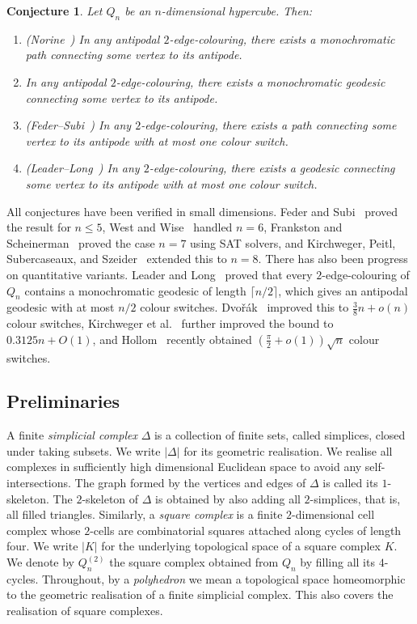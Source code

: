 \documentclass[12pt,UKenglish]{amsart}
\theoremstyle{plain}
\newtheorem{conjecture}[conjecture]{Conjecture}
\theoremstyle{definition}
\theoremstyle{remark}
\begin{document}
\begin{conjecture}\label{NorineConj}
    Let \(Q_n\) be an \(n\)-dimensional hypercube. Then:
    \begin{enumerate}
        \item (Norine~\cite{Norine}) In any antipodal \(2\)-edge-colouring, there exists a monochromatic path connecting some vertex to its antipode.
        \item In any antipodal \(2\)-edge-colouring, there exists a monochromatic geodesic connecting some vertex to its antipode.
        \item (Feder--Subi~\cite{FederSubi}) In any \(2\)-edge-colouring, there exists a path connecting some vertex to its antipode with at most one colour switch.
        \item (Leader--Long~\cite{LeaderLong}) In any \(2\)-edge-colouring, there exists a geodesic connecting some vertex to its antipode with at most one colour switch.
     \end{enumerate}
\end{conjecture}

All conjectures have been verified in small dimensions. Feder and Subi~\cite{FederSubi} proved the result for \(n\le 5\), West and Wise~\cite{WestWise} handled \(n=6\), Frankston and Scheinerman~\cite{FrankstonScheinerman} proved the case \(n=7\) using SAT solvers, and Kirchweger, Peitl, Subercaseaux, and Szeider~\cite{kirchweger} extended this to \(n=8\). There has also been progress on quantitative variants. Leader and Long~\cite{LeaderLong} proved that every \(2\)-edge-colouring of \(Q_n\) contains a monochromatic geodesic of length \(\lceil n/2\rceil\), which gives an antipodal geodesic with at most \(n/2\) colour switches. Dvo\v{r}\'ak~\cite{Dvorak} improved this to \(\frac{3}{8}n+o(n)\) colour switches, Kirchweger et al.~\cite{kirchweger} further improved the bound to \(0.3125n+O(1)\), and Hollom~\cite{hollom2026hypercubegeodesicscolourchanges} recently obtained \((\frac{\pi}{2}+o(1))\sqrt n\) colour switches.


\subsection*{Preliminaries}
A finite \emph{simplicial complex} $\Delta$ is a collection of finite sets, called simplices, closed under taking subsets. We write $|\Delta|$ for its geometric realisation. We realise all complexes in sufficiently high dimensional Euclidean space to avoid any self-intersections. The graph formed by the vertices and edges of $\Delta$ is called its $1$-skeleton. The $2$-skeleton of $\Delta$ is obtained by also adding all $2$-simplices, that is, all filled triangles. Similarly, a \emph{square complex} is a finite $2$-dimensional cell complex whose $2$-cells are combinatorial squares attached along cycles of length four. We write $|K|$ for the underlying topological space of a square complex $K$.  We denote by $Q_n^{(2)}$ the square complex obtained from $Q_n$ by filling all its $4$-cycles. Throughout, by a \emph{polyhedron} we mean a topological space homeomorphic to the geometric realisation of a finite simplicial complex. This also covers the realisation of square complexes.
\end{document}
